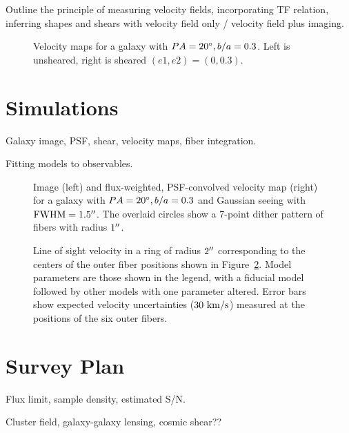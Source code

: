 Outline the principle of measuring velocity fields, incorporating TF
relation, inferring shapes and shears with velocity field only /
velocity field plus imaging.

\begin{figure*}[htb]
\caption{Velocity maps for a galaxy with $PA=20\mbox{$^\circ$}, b/a=0.3$. Left is unsheared, right is sheared $(e1,e2)=(0,0.3)$.}
\label{speclens_fig:vmap}
\end{figure*}
 

\section{Simulations}

Galaxy image, PSF, shear, velocity maps, fiber integration.

Fitting models to observables.

\begin{figure*}[htb]
\caption{Image (left) and flux-weighted, PSF-convolved velocity map
  (right) for a galaxy with $PA=20\mbox{$^\circ$}, b/a=0.3$ and Gaussian seeing
  with $\rm{FWHM}=1.5\mbox{$^{\prime\prime}$}$. The overlaid circles show a 7-point dither
  pattern of fibers with radius $1\mbox{$^{\prime\prime}$}$.}
\label{speclens_fig:fiber_pattern}
\end{figure*}

\begin{figure*}[htb]
\caption{Line of sight velocity in a ring of radius $2\mbox{$^{\prime\prime}$}$
  corresponding to the centers of the outer fiber positions shown in
  Figure~\ref{speclens_fig:fiber_pattern}. Model parameters are those shown in
  the legend, with a fiducial model followed by other models with one
  parameter altered. Error bars show expected velocity uncertainties
  ($30~{\rm km/s}$) measured at the positions of the six outer fibers.}
\label{speclens_fig:observable}
\end{figure*}


\section{Survey Plan}

Flux limit, sample density, estimated S/N.

Cluster field, galaxy-galaxy lensing, cosmic shear??

